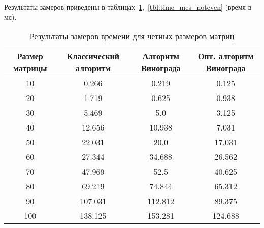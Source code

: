 Результаты замеров приведены в таблицах~\ref{tbl:time_mes_even},~\ref{tbl:time_mes_noteven} (время в мс).

\begin{landscape}
\begin{table}[H]
	\begin{center}
		\begin{threeparttable}
			\captionsetup{justification=raggedright, singlelinecheck=off}
			\caption{Результаты замеров времени для четных размеров матриц}
			\label{tbl:time_mes_even}
			\begin{tabular}{|c|c|c|c|}
				\hline
				Размер матрицы & Классический алгоритм & Алгоритм Винограда & Опт. алгоритм Винограда\\
				\hline
				10&0.266&0.219&0.125\\
				\hline
				20&1.719&0.625&0.938\\
				\hline
				30&5.469&5.0&3.125\\
				\hline
				40&12.656&10.938&7.031\\
				\hline
				50&22.031&20.0&17.031\\
				\hline
				60&27.344&34.688&26.562\\
				\hline
				70&47.969&52.5&40.625\\
				\hline
				80&69.219&74.844&65.312\\
				\hline
				90&107.031&112.812&89.375\\
				\hline
				100&138.125&153.281&124.688\\
				\hline
			\end{tabular}
		\end{threeparttable}
	\end{center}
\end{table}


\end{landscape}
